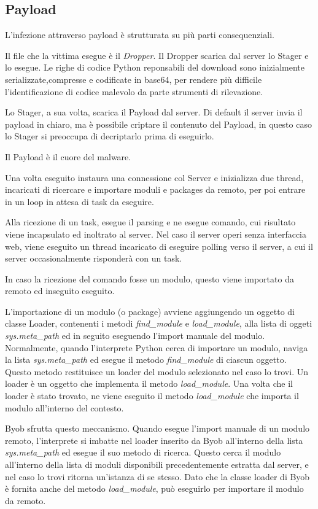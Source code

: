 \subsection{Payload}

L'infezione attraverso payload è strutturata su più parti consequenziali.

Il file che la vittima esegue è il \textit{Dropper}.
Il Dropper scarica dal server lo Stager e lo esegue. Le righe di codice Python reponsabili del download sono inizialmente serializzate,compresse e codificate in base64, per rendere più difficile l'identificazione di codice malevolo da parte strumenti di rilevazione.

Lo Stager, a sua volta, scarica il Payload dal server.  Di default il server invia il payload in chiaro, ma è possibile criptare il contenuto del Payload, in questo caso lo Stager si preoccupa di decriptarlo prima di eseguirlo.

Il Payload è il cuore del malware.

Una volta eseguito instaura una connessione col Server e inizializza due thread, incaricati di ricercare e importare  moduli e packages da remoto, per poi entrare in un loop in attesa di task da eseguire.

Alla ricezione di un task,  esegue il parsing e ne esegue comando, cui  risultato viene incapsulato ed inoltrato al server.
Nel caso il server operi  senza interfaccia web, viene eseguito un thread incaricato di eseguire polling verso il server, a cui il server occasionalmente risponderà con un task.

In caso la ricezione del comando fosse un modulo, questo viene importato da remoto ed inseguito eseguito.

L'importazione di un modulo (o package) avviene aggiungendo un oggetto di classe Loader, contenenti i metodi \textit{find\_module} e \textit{load\_module}, alla lista di oggeti \textit{sys.meta\_path} ed in seguito eseguendo l'import manuale del modulo. 
Normalmente, quando l'interprete Python cerca di importare un modulo, naviga la lista \textit{sys.meta\_path} ed esegue il metodo \textit{find\_module} di ciascun oggetto. Questo metodo restituisce un loader del modulo selezionato nel caso lo trovi. Un loader è un oggetto che implementa il metodo \textit{load\_module}.
Una volta che il loader è stato trovato, ne viene eseguito il metodo \textit{load\_module} che importa il modulo all'interno del contesto.

Byob sfrutta questo meccanismo. Quando esegue l'import manuale di un modulo remoto, l'interprete si imbatte nel loader inserito da Byob all'interno della lista \textit{sys.meta\_path} ed esegue il suo metodo di ricerca. Questo cerca il modulo all'interno della lista di moduli disponibili precedentemente estratta dal server, e nel caso lo trovi ritorna un'istanza di se stesso. Dato che la classe loader di Byob è fornita anche del metodo \textit{load\_module}, può eseguirlo per importare il modulo da remoto.



